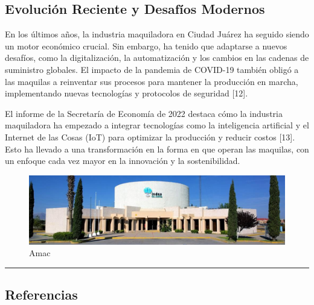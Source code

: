 \documentclass[
  letterpaper,
]{book}
\begin{document}
\subsection{Evolución Reciente y Desafíos
Modernos}\label{evoluciuxf3n-reciente-y-desafuxedos-modernos}

En los últimos años, la industria maquiladora en Ciudad Juárez ha
seguido siendo un motor económico crucial. Sin embargo, ha tenido que
adaptarse a nuevos desafíos, como la digitalización, la automatización y
los cambios en las cadenas de suministro globales. El impacto de la
pandemia de COVID-19 también obligó a las maquilas a reinventar sus
procesos para mantener la producción en marcha, implementando nuevas
tecnologías y protocolos de seguridad {[}12{]}.

El informe de la Secretaría de Economía de 2022 destaca cómo la
industria maquiladora ha empezado a integrar tecnologías como la
inteligencia artificial y el Internet de las Cosas (IoT) para optimizar
la producción y reducir costos {[}13{]}. Esto ha llevado a una
transformación en la forma en que operan las maquilas, con un enfoque
cada vez mayor en la innovación y la sostenibilidad.

\begin{figure}[H]

{\centering \includegraphics{Img/Amac.jpg}

}

\caption{Amac}

\end{figure}%

\begin{center}\rule{0.5\linewidth}{0.5pt}\end{center}

\subsection{Referencias}\label{referencias}
\end{document}
